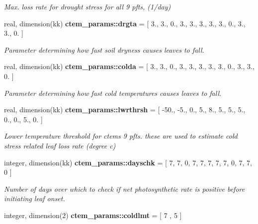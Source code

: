 \begin{DoxyCompactItemize}
\begin{DoxyCompactList}\small\item\em Max. loss rate for drought stress for all 9 pfts, (1/day) \end{DoxyCompactList}\item 
\hypertarget{namespacectem__params_ad4b4b2e3174bff5d48329ff00f79da67}{}real, dimension(kk) {\bfseries ctem\+\_\+params\+::drgta} = \mbox{[} 3., 3., 0., 3., 3., 3., 3., 3., 0., 3., 3., 0. \mbox{]}\label{namespacectem__params_ad4b4b2e3174bff5d48329ff00f79da67}

\begin{DoxyCompactList}\small\item\em Parameter determining how fast soil dryness causes leaves to fall. \end{DoxyCompactList}\item 
\hypertarget{namespacectem__params_a261cdad7b84fcd118ef12b82da029bb7}{}real, dimension(kk) {\bfseries ctem\+\_\+params\+::colda} = \mbox{[} 3., 3., 0., 3., 3., 3., 3., 3., 0., 3., 3., 0. \mbox{]}\label{namespacectem__params_a261cdad7b84fcd118ef12b82da029bb7}

\begin{DoxyCompactList}\small\item\em Parameter determining how fast cold temperatures causes leaves to fall. \end{DoxyCompactList}\item 
\hypertarget{namespacectem__params_abef1f9707a8519b0dd657de37edc26b1}{}real, dimension(kk) {\bfseries ctem\+\_\+params\+::lwrthrsh} = \mbox{[} -\/50., -\/5., 0., 5., 8., 5., 5., 5., 0., 0., 5., 0. \mbox{]}\label{namespacectem__params_abef1f9707a8519b0dd657de37edc26b1}

\begin{DoxyCompactList}\small\item\em Lower temperature threshold for ctem\textquotesingle{}s 9 pfts. these are used to estimate cold stress related leaf loss rate (degree c) \end{DoxyCompactList}\item 
\hypertarget{namespacectem__params_abae86d324b328aaf473431198d8e3642}{}integer, dimension(kk) {\bfseries ctem\+\_\+params\+::dayschk} = \mbox{[} 7, 7, 0, 7, 7, 7, 7, 7, 0, 7, 7, 0 \mbox{]}\label{namespacectem__params_abae86d324b328aaf473431198d8e3642}

\begin{DoxyCompactList}\small\item\em Number of days over which to check if net photosynthetic rate is positive before initiating leaf onset. \end{DoxyCompactList}\item 
\hypertarget{namespacectem__params_a3eee73b19e09e9aab077477b6d1d9419}{}integer, dimension(2) {\bfseries ctem\+\_\+params\+::coldlmt} = \mbox{[} 7 , 5 \mbox{]}\label{namespacectem__params_a3eee73b19e09e9aab077477b6d1d9419}


\end{DoxyCompactItemize}
